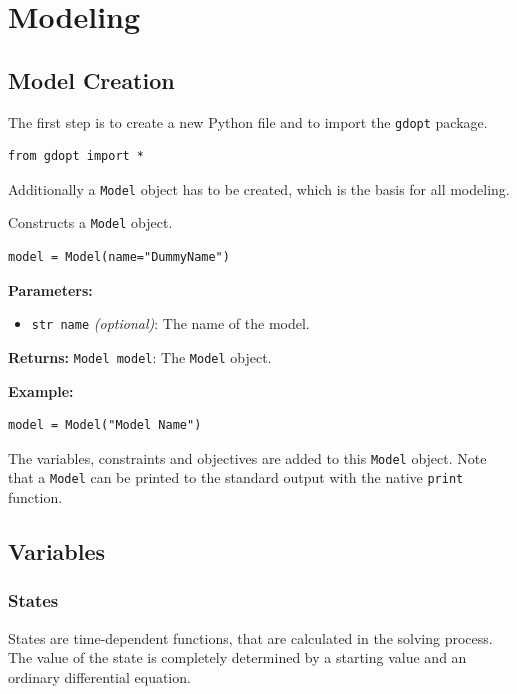 \documentclass[12pt]{article}
\begin{document}
\section{Modeling}

\subsection{Model Creation}
The first step is to create a new Python file and to import the
\texttt{gdopt} package.
\begin{lstlisting}
from gdopt import *
	\end{lstlisting}

Additionally a \texttt{Model} object has to be created, which is the basis for
all modeling.

\begin{mdframed}[backgroundcolor=gray!10, roundcorner=10pt, linewidth=1pt]

	Constructs a \texttt{Model} object.

	\begin{lstlisting}
model = Model(name="DummyName")
	\end{lstlisting}\label{Model}

	\textbf{Parameters:}
	\begin{itemize}
		\item \texttt{str name} \emph{(optional)}: The name of the
		      model.
	\end{itemize}

	\textbf{Returns:}
	\texttt{Model model}: The \texttt{Model} object.

	\textbf{Example:}
	\begin{lstlisting}
model = Model("Model Name")
	\end{lstlisting}
\end{mdframed}

The variables, constraints and objectives are added to this
\texttt{Model} object. Note that a \texttt{Model} can be printed to the
standard output with the native \texttt{print} function.

\subsection{Variables}

\subsubsection{States}

States are time-dependent functions, that are calculated in the
solving process. The value of the state is completely determined by a starting
value and an ordinary differential equation.
\end{document}
